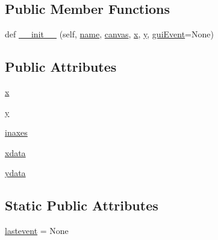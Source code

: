 \subsection*{Public Member Functions}
\begin{DoxyCompactItemize}
\item 
def \hyperlink{classmatplotlib_1_1backend__bases_1_1LocationEvent_ad017d901547558c823b273c601d2f8a5}{\+\_\+\+\_\+init\+\_\+\+\_\+} (self, \hyperlink{classmatplotlib_1_1backend__bases_1_1Event_a4b10ea7af7c8a0b20bcdbb9ca03e1654}{name}, \hyperlink{classmatplotlib_1_1backend__bases_1_1Event_a7721d867d81a1255b1aeb51babec4e14}{canvas}, \hyperlink{classmatplotlib_1_1backend__bases_1_1LocationEvent_aad07eb863241b9e4a4bfce29833a693b}{x}, \hyperlink{classmatplotlib_1_1backend__bases_1_1LocationEvent_a77dbd95e105ce5a66024d85dac58943b}{y}, \hyperlink{classmatplotlib_1_1backend__bases_1_1Event_a6cc1dc3c9479b3e5f227f329037adb98}{gui\+Event}=None)
\end{DoxyCompactItemize}
\subsection*{Public Attributes}
\begin{DoxyCompactItemize}
\item 
\hyperlink{classmatplotlib_1_1backend__bases_1_1LocationEvent_aad07eb863241b9e4a4bfce29833a693b}{x}
\item 
\hyperlink{classmatplotlib_1_1backend__bases_1_1LocationEvent_a77dbd95e105ce5a66024d85dac58943b}{y}
\item 
\hyperlink{classmatplotlib_1_1backend__bases_1_1LocationEvent_ac563313a56cdd6579b84ebc6ee8d545a}{inaxes}
\item 
\hyperlink{classmatplotlib_1_1backend__bases_1_1LocationEvent_a79e771e04f46bb8f78962c90626db87c}{xdata}
\item 
\hyperlink{classmatplotlib_1_1backend__bases_1_1LocationEvent_a1d1b09cffeecc3741a63e115613f6c73}{ydata}
\end{DoxyCompactItemize}
\subsection*{Static Public Attributes}
\begin{DoxyCompactItemize}
\item 
\hyperlink{classmatplotlib_1_1backend__bases_1_1LocationEvent_a4a8a7c31d8059fed0e168176ad57dc9d}{lastevent} = None
\end{DoxyCompactItemize}


